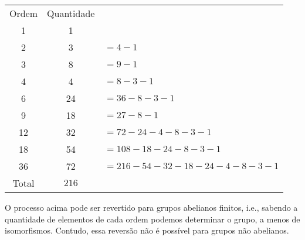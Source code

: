 	\begin{center}
		\begin{tabular}{|c|c|l}
			\cline{1-2}
			Ordem & Quantidade & \\
			\cline{1-2}
			1 & 1 & \\
			\cline{1-2}
			2 & 3 & $= 4 - 1$\\
			\cline{1-2}
			3 & 8 & $= 9 - 1$\\
			\cline{1-2}
			4 & 4 & $= 8 - 3 - 1$\\
			\cline{1-2}
			6 & 24 & $= 36 - 8 - 3 - 1$\\
			\cline{1-2}
			9 & 18 & $= 27 - 8 - 1$\\
			\cline{1-2}
			12 & 32 & $= 72 - 24 - 4 - 8 - 3 - 1$\\
			\cline{1-2}
			18 & 54 & $= 108 - 18 - 24 - 8 - 3 - 1$\\
			\cline{1-2}
			36 & 72 & $= 216 - 54 - 32 - 18 - 24 - 4 - 8 - 3 - 1$ \\
			\cline{1-2}
			Total & $216$ &  \\
			\cline{1-2}
		\end{tabular}
	\end{center}
	\par\vspace{0.3cm} O processo acima pode ser revertido para grupos abelianos finitos, i.e., sabendo a quantidade de elementos de cada ordem podemos determinar o grupo, a menos de isomorfismos. Contudo, essa reversão não é possível para grupos não abelianos.
